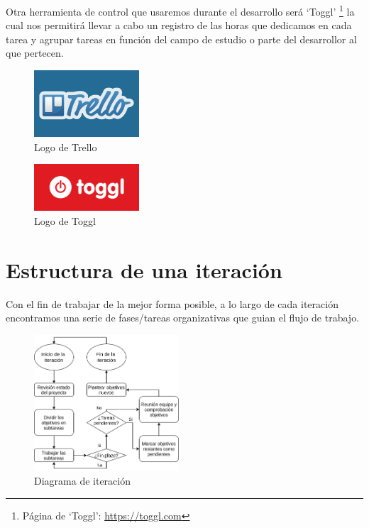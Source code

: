 Otra herramienta de control que usaremos durante el desarrollo será `Toggl'
\footnote{Página de `Toggl':  \url{https://toggl.com}}
la cual nos permitirá llevar a cabo un registro de las horas que dedicamos en cada tarea
y agrupar tareas en función del campo de estudio o parte del desarrollor al que pertecen.

\begin{figure}[ht]
\centering
\includegraphics[width=0.35\textwidth]{imagenes/metodologia/logo-trello.png}
\caption{Logo de Trello}
\label{img:trello}
\end{figure}

\begin{figure}[htb]
\centering
\includegraphics[width=0.35\textwidth]{imagenes/metodologia/logo-toggl.png}
\caption{Logo de Toggl}
\label{img:toggl}
\end{figure}

\section{Estructura de una iteración}
Con el fin de trabajar de la mejor forma posible, a lo largo de cada iteración encontramos una 
serie de fases/tareas organizativas que guian el flujo de trabajo.    

\begin{figure}[hbt]
\centering
\includegraphics[width=0.48\textwidth]{imagenes/metodologia/Flow-iteracion.png}
\caption{Diagrama de iteración}
\label{img:fases_it}
\end{figure}

